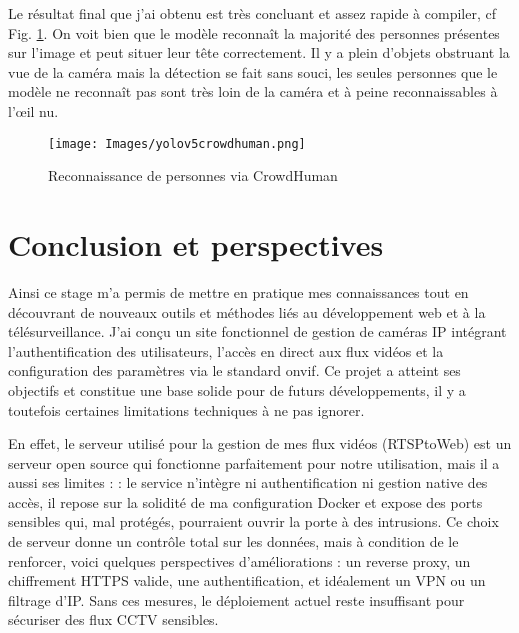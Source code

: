 Le résultat final que j'ai obtenu est très concluant et assez rapide à compiler, cf Fig. \ref{fig:crowdhuman}. On voit bien que le modèle reconnaît la majorité des personnes présentes sur l'image et peut situer leur tête correctement. Il y a plein d'objets obstruant la vue de la caméra mais la détection se fait sans souci, les seules personnes que le modèle ne reconnaît pas sont très loin de la caméra et à peine reconnaissables à l’œil nu.

\begin{figure}[H]
    \centering
    \texttt{[image: Images/yolov5crowdhuman.png]}
    \caption{Reconnaissance de personnes via CrowdHuman}
    \label{fig:crowdhuman}
\end{figure}



\newpage
{}
\chapter*{Conclusion et perspectives}

Ainsi ce stage m’a permis de mettre en pratique mes connaissances tout en découvrant de nouveaux outils et méthodes liés au développement web et à la télésurveillance. J’ai conçu un site fonctionnel de gestion de caméras IP intégrant l’authentification des utilisateurs, l’accès en direct aux flux vidéos et la configuration des paramètres via le standard \acrshort{onvif}. Ce projet a atteint ses objectifs et constitue une base solide pour de futurs développements, il y a toutefois certaines limitations techniques à ne pas ignorer. 

En effet, le serveur utilisé pour la gestion de mes flux vidéos (RTSPtoWeb) est un serveur open source qui fonctionne parfaitement pour notre utilisation, mais il a aussi ses limites : : le service n’intègre ni authentification ni gestion native des accès, il repose sur la solidité de ma configuration Docker et expose des ports sensibles qui, mal protégés, pourraient ouvrir la porte à des intrusions. Ce choix de serveur donne un contrôle total sur les données, mais à condition de le renforcer, voici quelques perspectives d'améliorations : un reverse proxy, un chiffrement HTTPS valide, une authentification, et idéalement un VPN ou un filtrage d’IP. Sans ces mesures, le déploiement actuel reste insuffisant pour sécuriser des flux CCTV sensibles.





